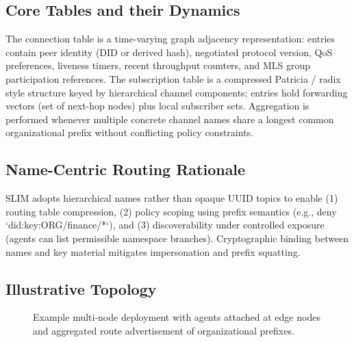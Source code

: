 \documentclass{article}
\theoremstyle{definition}
\theoremstyle{remark}
\begin{document}
\subsection{Core Tables and their Dynamics}
The connection table is a time-varying graph adjacency representation: entries contain peer identity (DID or derived hash), negotiated protocol version, QoS preferences, liveness timers, recent throughput counters, and MLS group participation references. The subscription table is a compressed Patricia / radix style structure keyed by hierarchical channel components; entries hold forwarding vectors (set of next-hop nodes) plus local subscriber sets. Aggregation is performed whenever multiple concrete channel names share a longest common organizational prefix without conflicting policy constraints.

\subsection{Name-Centric Routing Rationale}
SLIM adopts hierarchical names rather than opaque UUID topics to enable (1) routing table compression, (2) policy scoping using prefix semantics (e.g., deny `did:key:ORG/finance/*`), and (3) discoverability under controlled exposure (agents can list permissible namespace branches). Cryptographic binding between names and key material mitigates impersonation and prefix squatting.

\subsection{Illustrative Topology}
\begin{figure}[H]
  \centering
  \caption{Example multi-node deployment with agents attached at edge nodes and aggregated route advertisement of organizational prefixes.}
  \label{fig:topology}
\end{figure}
\end{document}
